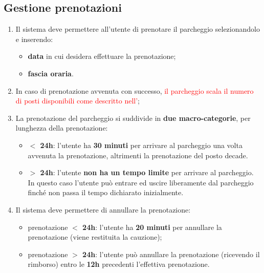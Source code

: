 \subsection{Gestione prenotazioni}
\begin{enumerate}[start=18,label={\bfseries RF\arabic*}]
    \item \label{itm:RF18} Il sistema deve permettere all’utente di prenotare il parcheggio selezionandolo e inserendo:
    \begin{itemize}
        \item \textbf{data} in cui desidera effettuare la prenotazione;
        \item \textbf{fascia oraria}.
    \end{itemize}
    \item \label{itm:RF19}In caso di prenotazione avvenuta con successo, \textcolor{red}{il parcheggio scala il numero di posti disponibili come descritto nell'\textbf{}};
    \item \label{itm:RF20}La prenotazione del parcheggio si suddivide in \textbf{due macro-categorie}, per lunghezza della prenotazione:
    \begin{itemize}
        \item \textbf{$<$ 24h}: l’utente ha \textbf{30 minuti} per arrivare al parcheggio una volta avvenuta la prenotazione, altrimenti la prenotazione del posto decade.
        \item \textbf{$>$ 24h}: l’utente \textbf{non ha un tempo limite} per arrivare al parcheggio. In questo caso l’utente può entrare ed uscire liberamente dal parcheggio finché non passa il tempo dichiarato inizialmente.
    \end{itemize}
    \item \label{itm:RF21}Il sistema deve permettere di annullare la prenotazione:
    \begin{itemize}
        \item prenotazione \textbf{$<$ 24h}: l’utente ha \textbf{20 minuti} per annullare la prenotazione (viene restituita la cauzione);
        \item prenotazione \textbf{$>$ 24h}: l’utente può annullare la prenotazione (ricevendo il rimborso) entro le \textbf{12h} precedenti l’effettiva prenotazione.
    \end{itemize}
\end{enumerate}

